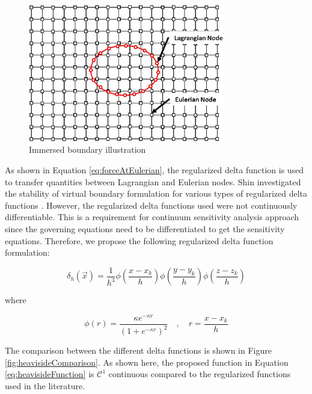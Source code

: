 \documentclass[12pt]{aiaa-pretty}
\begin{document}
%
\begin{figure}[H]
	\centering
	\includegraphics[height=6.0cm]{figure/immerdBoundary.jpg}
	\caption{Immersed boundary illustration}
	\label{fig:immersedBoundary}
\end{figure}
%

As shown in Equation \eqref{eq:forceAtEulerian}, the regularized delta function is used to transfer quantities between Lagrangian and Eulerian nodes. Shin investigated the stability of virtual boundary formulation for various types of regularized delta functions \cite{shin2008assessment}. However, the regularized delta functions used were not continuously differentiable. This is a requirement for continuum sensitivity analysis approach since the governing equations need to be differentiated to get the sensitivity equations. Therefore, we propose the following regularized delta function formulation:

%
\begin{equation}\label{eq:heavisideFunction}
	\delta_h(\vec{x}) = \frac{1}{h^3} \phi \left( \frac{x - x_k}{h} \right)
									 \phi \left( \frac{y - y_k}{h} \right)
									 \phi \left( \frac{z - z_k}{h} \right)
\end{equation}
%

where

%
\begin{equation}\label{eq:continuousDeltaFunction}
	\phi(r) = \frac{\kappa e^{-\kappa r}}{\left( 1 + e^{-\kappa r} \right)^2} \quad , \quad r = \frac{x - x_k}{h}
\end{equation}
%

The comparison between the different delta functions is shown in Figure \ref{fig:heavisideComparison}. As shown here, the proposed function in Equation \eqref{eq:heavisideFunction} is $\mathcal{C}^1$ continuous compared to the regularized functions used in the literature.
\end{document}
